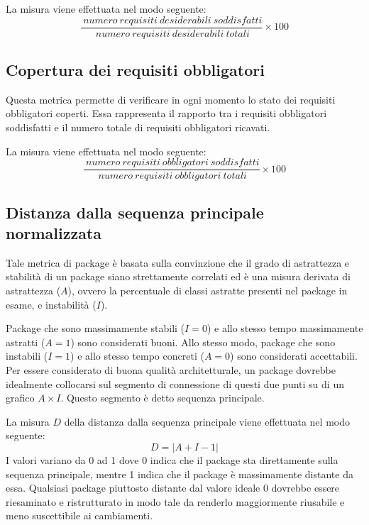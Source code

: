 La misura viene effettuata nel modo seguente:
\begin{equation}
	\frac{~numero~requisiti~desiderabili~soddisfatti}{~numero~requisiti~desiderabili~totali}\times{100}
\end{equation}


\subsection{Copertura dei requisiti obbligatori}
Questa metrica permette di verificare in ogni momento lo stato dei requisiti obbligatori coperti. Essa rappresenta il rapporto tra i requisiti obbligatori soddisfatti e il numero totale di requisiti obbligatori ricavati.

La misura viene effettuata nel modo seguente:
\begin{equation}
	\frac{~numero~requisiti~obbligatori~soddisfatti}{~numero~requisiti~obbligatori~totali}\times{100}
\end{equation}


\subsection{Distanza dalla sequenza principale normalizzata} 
Tale metrica di package è basata sulla convinzione che il grado di astrattezza e stabilità di un package siano strettamente correlati ed è una misura derivata di astrattezza ($A$), ovvero la percentuale di classi astratte presenti nel package in esame, e instabilità ($I$). 

Package che sono massimamente stabili ($I = 0$) e allo stesso tempo massimamente astratti ($A = 1$) sono considerati buoni. Allo stesso modo, package che sono instabili ($I = 1$) e allo stesso tempo concreti ($A = 0$) sono considerati accettabili. Per essere considerato di buona qualità architetturale, un package dovrebbe idealmente collocarsi sul segmento di connessione di questi due punti su di un grafico $A \times I$. Questo segmento è detto sequenza principale.

La misura $D$ della distanza dalla sequenza principale viene effettuata nel modo seguente:
\begin{equation}
	D = | A + I - 1 | 
\end{equation}
I valori variano da 0 ad 1 dove 0 indica che il package sta direttamente sulla sequenza principale, mentre 1 indica che il package è massimamente distante da essa. Qualsiasi package piuttosto distante dal valore ideale 0 dovrebbe essere riesaminato e ristrutturato in modo tale da renderlo maggiormente riusabile e meno suscettibile ai cambiamenti.


